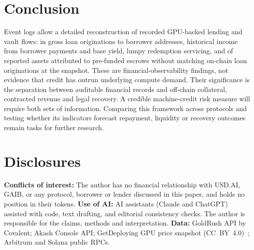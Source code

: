 \section{Conclusion}
Event logs allow a detailed reconstruction of recorded GPU-backed lending and vault flows: \Originated{} in gross loan originations to \NBorrowers{} borrower addresses, historical income from borrower payments and base yield, lumpy redemption servicing, and \DTShare{} of reported assets attributed to pre-funded escrows without matching on-chain loan originations at the snapshot. These are financial-observability findings, not evidence that credit has outrun underlying compute demand. Their significance is the separation between auditable financial records and off-chain collateral, contracted revenue and legal recovery. A credible machine-credit risk measure will require both sets of information. Comparing this framework across protocols and testing whether its indicators forecast repayment, liquidity or recovery outcomes remain tasks for further research.

\section*{Disclosures}
\textbf{Conflicts of interest:} The author has no financial relationship with USD.AI, GAIB, or any protocol, borrower or lender discussed in this paper, and holds no position in their tokens. \textbf{Use of AI:} AI assistants (Claude and ChatGPT) assisted with code, text drafting, and editorial consistency checks. The author is responsible for the claims, methods and interpretation. \textbf{Data:} GoldRush API by Covalent; Akash Console API; GetDeploying GPU price snapshot (CC~BY~4.0)~\cite{getdeploying}; Arbitrum and Solana public RPCs.
